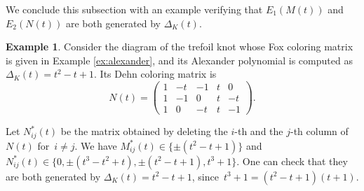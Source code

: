 \documentclass[11pt,a4paper]{article}
\theoremstyle{definition}
\newtheorem{example}[theorem]{Example}
\begin{document}
We conclude this subsection with an example verifying that $E_1(M(t))$ and $E_2(N(t))$ are both generated by $\Delta_K(t)$.

\begin{example}
Consider the diagram of the trefoil knot whose Fox coloring matrix is given in Example \ref{ex:alexander}, and its Alexander polynomial is computed as $\Delta_K(t) = t^2-t+1$. Its Dehn coloring matrix is 
\begin{equation*}
N(t) = \begin{pmatrix}
1& -t & -1 & t & 0 \\
1 & -1 & 0 & t & -t \\
1 & 0 & -t & t & -1
\end{pmatrix}.
\end{equation*}

Let $N_{ij}^*(t)$ be the matrix obtained by deleting the $i$-th and the $j$-th column of $N(t)$ for~$i \neq j$. We have $M_{ij}^*(t) \in \{\pm (t^2 -t +1)\}$ and~$N_{ij}^*(t) \in \{ 0, \pm (t^3-t^2+t), \pm (t^2-t+1), t^3+1\}$. One can check that they are both generated by $\Delta_K(t) = t^2-t+1$, since~$t^3+1 = (t^2-t+1)(t+1).$
\end{example}
\end{document}
